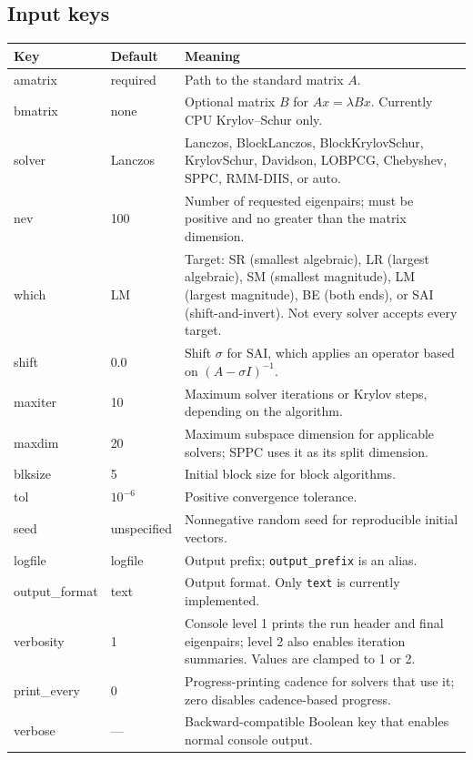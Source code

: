 \documentclass[11pt]{article}
\newcommand{\code}[1]{\texttt{#1}}
\begin{document}
\subsection{Input keys}

\renewcommand{\arraystretch}{1.15}
\begin{longtable}{>{\ttfamily}p{}p{}p{}}
\toprule
\normalfont Key & Default & Meaning \\
\midrule
\endhead
amatrix & required & Path to the standard matrix \(A\). \\
bmatrix & none & Optional matrix \(B\) for \(Ax=\lambda Bx\).  Currently CPU Krylov--Schur only. \\
solver & Lanczos & Lanczos, BlockLanczos, BlockKrylovSchur, KrylovSchur, Davidson, LOBPCG, Chebyshev, SPPC, RMM-DIIS, or auto. \\
nev & 100 & Number of requested eigenpairs; must be positive and no greater than the matrix dimension. \\
which & LM & Target: SR (smallest algebraic), LR (largest algebraic), SM (smallest magnitude), LM (largest magnitude), BE (both ends), or SAI (shift-and-invert).  Not every solver accepts every target. \\
shift & 0.0 & Shift \(\sigma\) for SAI, which applies an operator based on \((A-\sigma I)^{-1}\). \\
maxiter & 10 & Maximum solver iterations or Krylov steps, depending on the algorithm. \\
maxdim & 20 & Maximum subspace dimension for applicable solvers; SPPC uses it as its split dimension. \\
blksize & 5 & Initial block size for block algorithms. \\
tol & $10^{-6}$ & Positive convergence tolerance. \\
seed & unspecified & Nonnegative random seed for reproducible initial vectors. \\
logfile & logfile & Output prefix; \code{output\_prefix} is an alias. \\
output\_format & text & Output format.  Only \code{text} is currently implemented. \\
verbosity & 1 & Console level 1 prints the run header and final eigenpairs; level 2 also enables iteration summaries.  Values are clamped to 1 or 2. \\
print\_every & 0 & Progress-printing cadence for solvers that use it; zero disables cadence-based progress. \\
verbose & --- & Backward-compatible Boolean key that enables normal console output. \\
\bottomrule
\end{longtable}
\end{document}

